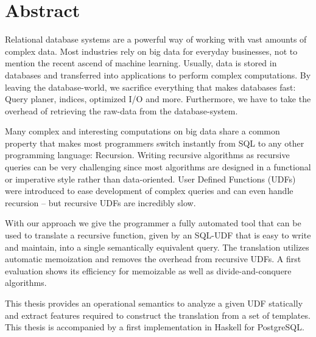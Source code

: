 \section*{Abstract}
Relational database systems are a powerful way of working with vast amounts of complex data. Most industries rely on big data for everyday businesses, not to mention the recent ascend of machine learning. Usually, data is stored in databases and transferred into applications to perform complex computations. By leaving the database-world, we sacrifice everything that makes databases fast: Query planer, indices, optimized I/O and more. Furthermore, we have to take the overhead of retrieving the raw-data from the database-system.

Many complex and interesting computations on big data share a common property that makes most programmers switch instantly from SQL to any other programming language: Recursion. Writing recursive algorithms as recursive queries can be very challenging since most algorithms are designed in a functional or imperative style rather than data-oriented. User Defined Functions (UDFs) were introduced to ease development of complex queries and can even handle recursion -- but recursive UDFs are incredibly slow.

With our approach we give the programmer a fully automated tool that can be used to translate a recursive function, given by an SQL-UDF that is easy to write and maintain, into a single semantically equivalent query. The translation utilizes automatic memoization and removes the overhead from recursive UDFs. A first evaluation shows its efficiency for memoizable as well as divide-and-conquere algorithms. 

This thesis provides an operational semantics to analyze a given UDF statically and extract features required to construct the translation from a set of templates. This thesis is accompanied by a first implementation in Haskell for PostgreSQL.